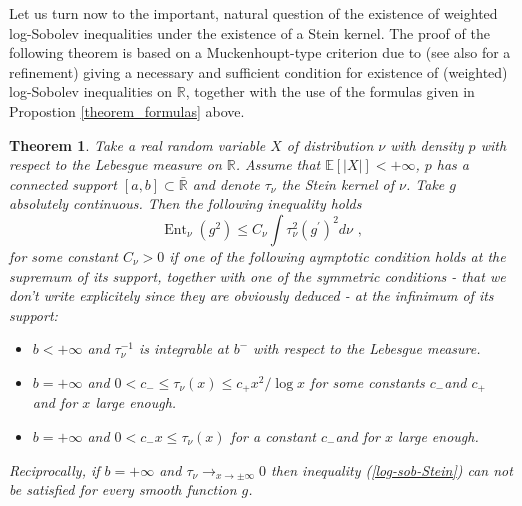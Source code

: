 \documentclass[11pt]{article}
\newtheorem{theorem}{Theorem}
\DeclareMathOperator{\ent}{Ent}
\begin{document}
Let us turn now to the important, natural question of the existence of
weighted log-Sobolev inequalities under the existence of a Stein kernel. The
proof of the following theorem is based on a Muckenhoupt-type criterion due
to \cite{MR1682772} (see also \cite{MR2052235} for a refinement) giving a
necessary and sufficient condition for existence of (weighted) log-Sobolev
inequalities on $\mathbb{R}$, together with the use of the formulas given in
Propostion \ref{theorem_formulas} above.

\begin{theorem}
\label{log-sob-stein-kernel}Take a real random variable $X$ of distribution $%
\nu $ with density $p$ with respect to the Lebesgue measure on $\mathbb{R}$.
Assume that $\mathbb{E}\left[ \left\vert X\right\vert \right] <+\infty $, $p$
has a connected support $\left[ a,b\right] \subset \mathbb{\bar{R}}$ and
denote $\tau _{\nu }$ the Stein kernel of $\nu $. Take $g$ absolutely
continuous. Then the following inequality holds%
\begin{equation}
\ent%
_{\nu }\left( g^{2}\right) \leq C_{\nu }\int \tau _{\nu }^{2}\left(
g^{\prime }\right) ^{2}d\nu \text{ ,}  \label{log-sob-Stein}
\end{equation}%
for some constant $C_{\nu }>0$ if one of the following aymptotic condition
holds at the supremum of its support, together with one of the symmetric
conditions - that we don't write explicitely since they are obviously
deduced - at the infinimum of its support:

\begin{itemize}
\item $b<+\infty $ and $\tau _{\nu }^{-1}$ is integrable at $b^{-}$ with
respect to the Lebesgue measure.

\item $b=+\infty $ and $0<c_{-}\leq \tau _{\nu }\left( x\right) \leq
c_{+}x^{2}/\log x$ for some constants $c_{-}$and $c_{+}$ and for $x$ large
enough.

\item $b=+\infty $ and $0<c_{-}x\leq \tau _{\nu }\left( x\right) $ for a
constant $c_{-}$and for $x$ large enough.
\end{itemize}

Reciprocally, if $b=+\infty $ and $\tau _{\nu }\rightarrow _{x\rightarrow
\pm \infty }0$ then inequality (\ref{log-sob-Stein}) can not be satisfied
for every smooth function $g$.
\end{theorem}
\end{document}
